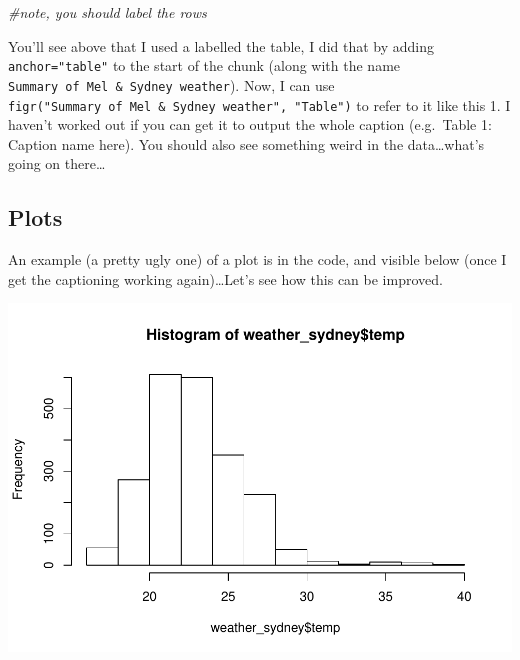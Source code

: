 \documentclass[]{article}
\newenvironment{Shaded}{\begin{snugshade}}{\end{snugshade}}
\newcommand{\CommentTok}[1]{\textcolor[rgb]{0.56,0.35,0.01}{\textit{#1}}}
\newcommand{\KeywordTok}[1]{\textcolor[rgb]{0.13,0.29,0.53}{\textbf{#1}}}
\newcommand{\NormalTok}[1]{#1}
\newcommand{\OperatorTok}[1]{\textcolor[rgb]{0.81,0.36,0.00}{\textbf{#1}}}
\begin{document}
\begin{Shaded}
\begin{Highlighting}[]
\CommentTok{#note, you should label the rows}
\end{Highlighting}
\end{Shaded}

You'll see above that I used a labelled the table, I did that by adding
\texttt{anchor="table"} to the start of the chunk (along with the name
\texttt{Summary\ of\ Mel\ \&\ Sydney\ weather}). Now, I can use
\texttt{figr("Summary\ of\ Mel\ \&\ Sydney\ weather",\ "Table")} to
refer to it like this 1. I haven't worked out if you can get it to
output the whole caption (e.g.~Table 1: Caption name here). You should
also see something weird in the data\ldots what's going on there\ldots{}

\hypertarget{plots}{%
\subsection{Plots}\label{plots}}

An example (a pretty ugly one) of a plot is in the code, and visible
below (once I get the captioning working again)\ldots Let's see how this
can be improved.

\begin{Shaded}
\end{Shaded}

\includegraphics{AT2_template__medium__files/figure-latex/basic histograms-1.pdf}
\end{document}
